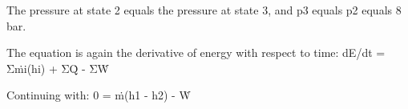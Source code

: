 The pressure at state 2 equals the pressure at state 3, and p3 equals p2 equals 8 bar.

The equation is again the derivative of energy with respect to time:
dE/dt = Σṁi(hi) + ΣQ̇ - ΣẆ

Continuing with:
0 = ṁ(h1 - h2) - Ẇ